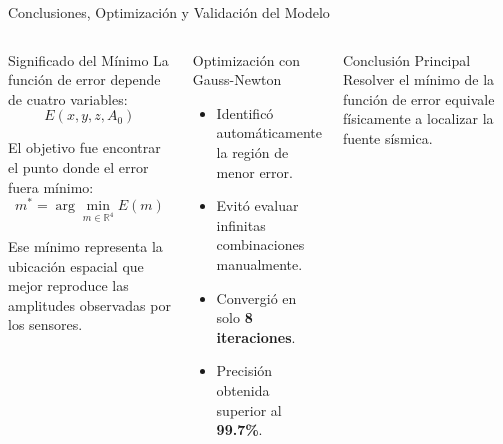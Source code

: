 
\begin{frame}{Conclusiones, Optimización y Validación del Modelo}

    \begin{columns}[T]


        \begin{block}{Significado del Mínimo}
            \scriptsize
            La función de error depende de cuatro variables:
            \[
                E(x,y,z,A_0)
            \]

            El objetivo fue encontrar el punto donde el error fuera mínimo:
            \[
                m^* = \arg\min_{m \in \mathbb{R}^4} E(m)
            \]

            Ese mínimo representa la ubicación espacial que mejor reproduce las amplitudes observadas por los sensores.
        \end{block}

        \vspace{0.15cm}

        \begin{exampleblock}{Optimización con Gauss-Newton}
            \scriptsize
            \begin{itemize}
                \item Identificó automáticamente la región de menor error.
                \item Evitó evaluar infinitas combinaciones manualmente.
                \item Convergió en solo \textbf{8 iteraciones}.
                \item Precisión obtenida superior al \textbf{99.7\%}.
            \end{itemize}
        \end{exampleblock}

        \vspace{0.15cm}

        \begin{block}{Conclusión Principal}
            \scriptsize
            Resolver el mínimo de la función de error equivale físicamente a localizar la fuente sísmica.
        \end{block}


\end{columns}
\end{frame}
